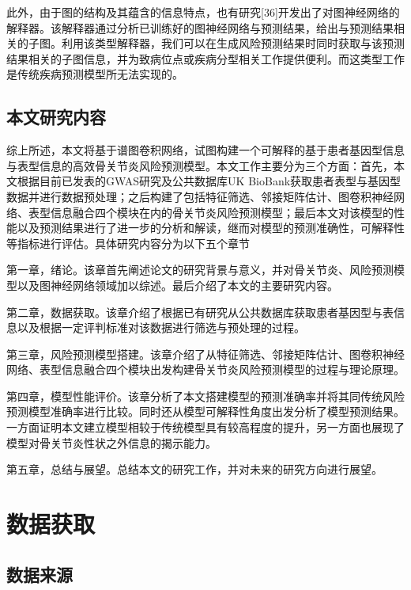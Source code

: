 \documentclass[
]{article}
\begin{document}
此外，由于图的结构及其蕴含的信息特点，也有研究{[}36{]}开发出了对图神经网络的解释器。该解释器通过分析已训练好的图神经网络与预测结果，给出与预测结果相关的子图。利用该类型解释器，我们可以在生成风险预测结果时同时获取与该预测结果相关的子图信息，并为致病位点或疾病分型相关工作提供便利。而这类型工作是传统疾病预测模型所无法实现的。

\hypertarget{ux672cux6587ux7814ux7a76ux5185ux5bb9}{%
\subsection{本文研究内容}\label{ux672cux6587ux7814ux7a76ux5185ux5bb9}}

综上所述，本文将基于谱图卷积网络，试图构建一个可解释的基于患者基因型信息与表型信息的高效骨关节炎风险预测模型。本文工作主要分为三个方面：首先，本文根据目前已发表的GWAS研究及公共数据库UK
BioBank获取患者表型与基因型数据并进行数据预处理；之后构建了包括特征筛选、邻接矩阵估计、图卷积神经网络、表型信息融合四个模块在内的骨关节炎风险预测模型；最后本文对该模型的性能以及预测结果进行了进一步的分析和解读，继而对模型的预测准确性，可解释性等指标进行评估。具体研究内容分为以下五个章节

第一章，绪论。该章首先阐述论文的研究背景与意义，并对骨关节炎、风险预测模型以及图神经网络领域加以综述。最后介绍了本文的主要研究内容。

第二章，数据获取。该章介绍了根据已有研究从公共数据库获取患者基因型与表信息以及根据一定评判标准对该数据进行筛选与预处理的过程。

第三章，风险预测模型搭建。该章介绍了从特征筛选、邻接矩阵估计、图卷积神经网络、表型信息融合四个模块出发构建骨关节炎风险预测模型的过程与理论原理。

第四章，模型性能评价。该章分析了本文搭建模型的预测准确率并将其同传统风险预测模型准确率进行比较。同时还从模型可解释性角度出发分析了模型预测结果。一方面证明本文建立模型相较于传统模型具有较高程度的提升，另一方面也展现了模型对骨关节炎性状之外信息的揭示能力。

第五章，总结与展望。总结本文的研究工作，并对未来的研究方向进行展望。

\hypertarget{ux6570ux636eux83b7ux53d6}{%
\section{数据获取}\label{ux6570ux636eux83b7ux53d6}}

\hypertarget{ux6570ux636eux6765ux6e90}{%
\subsection{数据来源}\label{ux6570ux636eux6765ux6e90}}
\end{document}
